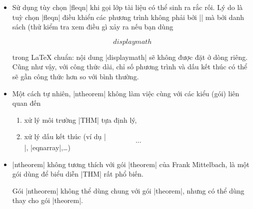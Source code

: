 \begin{itemize}
 \item
	Sử dụng tùy chọn |fleqn| khi gọi lớp tài liệu có thể sinh ra
	rắc rối. Lý do là tuỳ chọn |fleqn| điều khiển các phương trình
	không phải bởi |$$| mà bởi danh sách (thử kiểm tra xem điều
	gì xảy ra nếu bạn dùng
\begin{example}
  \begin{theorem} \[ displaymath \] \end{theorem}
\end{example}
	trong \LaTeX{} chuẩn: nội dung |displaymath| sẽ không được đặt ở dòng riêng.
	Cũng như vậy, với công thức dài, chỉ số phương trình và dấu kết thúc
	có thể sẽ gần công thức hơn so với bình thường.
 \item
	Một cách tự nhiên, |ntheorem| không làm việc cùng với các kiểu (gói)
	liên quan đến
  \begin{enumerate}
	\item xử lý môi trường |THM| tựa định lý,
	\item xử lý dấu kết thúc (ví dụ |\[...\]|, |eqnarray|,\ldots)
  \end{enumerate}
 \item
	|ntheorem| không tương thích với gói |theorem| của Frank Mittelbach,
	là một gói dùng để biểu diễn |THM| rất phổ biến.

	Gói |ntheorem| không thể dùng chung với gói |theorem|,
	nhưng có thể dùng thay cho gói |theorem|.
\end{itemize}

